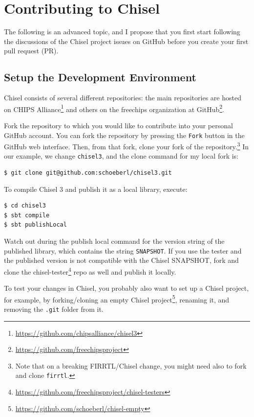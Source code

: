 \documentclass[%
    10pt,
    headinclude, footinclude=false,
    openright, %
    notitlepage,
    cleardoublepage=empty,
    headsepline,
    numbers=noenddot,
    bibliography=totoc, index=totoc,
    ]{scrbook}
\newcommand{\code}[1]{{\lstinline[basicstyle=\small\ttfamily]{#1}}}
\newcommand{\myref}[2]{\href{#1}{#2}}
\renewcommand{\myref}[2]{{#2}{\footnote{\url{#1}}}}
\begin{document}
\section{Contributing to Chisel}

The following is an advanced topic, and I propose that you first start following the discussions
of the Chisel project issues on GitHub before you create your first pull request (PR).

\subsection{Setup the Development Environment}

Chisel consists of several different repositories: the main repositories are hosted on
\myref{https://github.com/chipsalliance/chisel3}{CHIPS Alliance} and others on
the \myref{https://github.com/freechipsproject}{freechips organization at GitHub}.

Fork the repository to which you would like to contribute into your personal GitHub account.
You can fork the repository by pressing the \code{Fork} button in the GitHub web interface.
Then, from that fork, clone your fork of the repository.\footnote{Note that on a breaking
FIRRTL/Chisel change, you might need also to fork and clone \code{firrtl}.}
In our example, we change \code{chisel3}, and the clone command for my local fork is:

\begin{verbatim}
$ git clone git@github.com:schoeberl/chisel3.git
\end{verbatim}

To compile Chisel 3 and publish it as a local library, execute:
\begin{verbatim}
$ cd chisel3
$ sbt compile
$ sbt publishLocal
\end{verbatim}

Watch out during the publish local command for the version string of the published
library, which contains the string \code{SNAPSHOT}.
If you use the tester and the published version is not compatible with the Chisel
SNAPSHOT, fork and clone the \myref{https://github.com/freechipsproject/chisel-testers}{chisel-tester}
repo as well and publish it locally.

To test your changes in Chisel, you probably also want to set up a Chisel project,
for example, by forking/cloning an \myref{https://github.com/schoeberl/chisel-empty}{empty Chisel project},
renaming it, and removing the \code{.git} folder from it.
\end{document}
